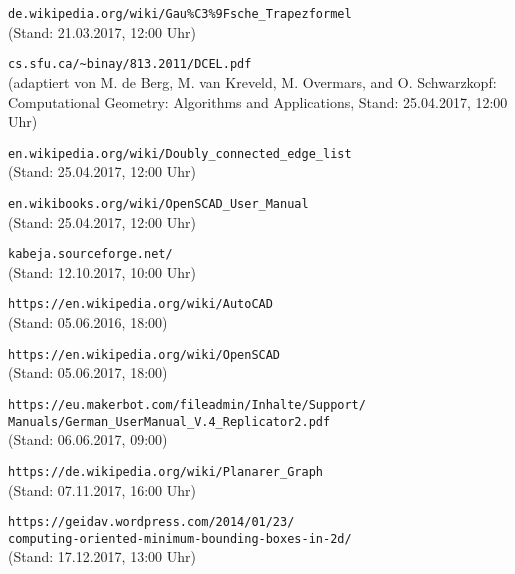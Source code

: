 \begin{thebibliography}{9}
		\verb|de.wikipedia.org/wiki/Gau%C3%9Fsche_Trapezformel| \\ (Stand: 21.03.2017, 12:00 Uhr)
		
		 \verb|cs.sfu.ca/~binay/813.2011/DCEL.pdf| \\ (adaptiert von M. de Berg, M. van Kreveld, M. Overmars, and O. Schwarzkopf: Computational Geometry: Algorithms and Applications, Stand: 25.04.2017, 12:00 Uhr)

		 \verb|en.wikipedia.org/wiki/Doubly_connected_edge_list| \\ (Stand: 25.04.2017, 12:00 Uhr)
		
		 \verb|en.wikibooks.org/wiki/OpenSCAD_User_Manual| \\ (Stand: 25.04.2017, 12:00 Uhr)
		
		 \verb|kabeja.sourceforge.net/| \\ (Stand: 12.10.2017, 10:00 Uhr)
		
		 
		 \verb|https://en.wikipedia.org/wiki/AutoCAD| \\ (Stand: 05.06.2016, 18:00)
		 
		 \verb|https://en.wikipedia.org/wiki/OpenSCAD| \\ (Stand: 05.06.2017, 18:00)
		 
		\verb|https://eu.makerbot.com/fileadmin/Inhalte/Support/| \\
		\tab \verb|Manuals/German_UserManual_V.4_Replicator2.pdf| \\ (Stand: 06.06.2017, 09:00)
	
		\verb|https://de.wikipedia.org/wiki/Planarer_Graph| \\ (Stand: 07.11.2017, 16:00 Uhr)
		
		\verb|https://geidav.wordpress.com/2014/01/23/|\\
		\verb|computing-oriented-minimum-bounding-boxes-in-2d/| \\ (Stand: 17.12.2017, 13:00 Uhr)
	
\end{thebibliography}